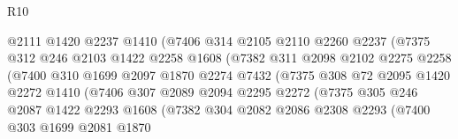 \begin{lexlean}{R10}
\begin{coremodule}
                            @2111
                            @1420
                            @2237
                            @1410
                            (@7406
                              @314
                              @2105
                              @2110
                              @2260
                              @2237
                              (@7375
                                @312
                                @246
                                @2103
                                @1422
                                @2258
                                @1608
                                (@7382
                                  @311
                                  @2098
                                  @2102
                                  @2275
                                  @2258
                                  (@7400
                                    @310
                                    @1699
                                    @2097
                                    @1870
                                    @2274
                                    @7432
                                    (@7375
                                      @308
                                      @72
                                      @2095
                                      @1420
                                      @2272
                                      @1410
                                      (@7406
                                        @307
                                        @2089
                                        @2094
                                        @2295
                                        @2272
                                        (@7375
                                          @305
                                          @246
                                          @2087
                                          @1422
                                          @2293
                                          @1608
                                          (@7382
                                            @304
                                            @2082
                                            @2086
                                            @2308
                                            @2293
                                            (@7400
                                              @303
                                              @1699
                                              @2081
                                              @1870

\end{coremodule}
\end{lexlean}
